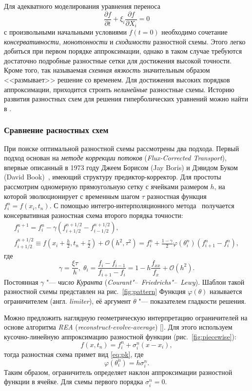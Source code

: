 Для адекватного моделирования уравнения переноса
\[ \frac{\partial f}{\partial t} + \xi_i\frac{\partial f}{\partial X_i} = 0 \]
с произвольными начальными условиями \( f(t=0)\)
необходимо сочетание \textit{консервативности}, \textit{монотонности} и \textit{сходимости} разностной схемы.
Этого легко добиться при первом порядке аппроксимации,
однако в таком случае требуются достаточно подробные разностные сетки для достижения высокой точности.
Кроме того, так называемая \textit{схемная вязкость} значительным образом <<размывает>> решение со временем.
Для достижения высоких порядков аппроксимации, приходится строить \textit{нелинейные} разностные схемы.
Историю развития разностных схем для решения гиперболических уравнений можно найти в \cite{vanLeer2006}.

\subsubsection{Сравнение расностных схем}

При поиске оптимальной разностной схемы рассмотрены два подхода.
Первый подход основан на \textit{методе коррекции потоков} (\textit{Flux-Corrected Transport}),
впервые описанный в 1973 году Джеем Борисом (Jay Boris) и Дэвидом Буком (David Book)~\cite{Boris1973},
имеющий структуру предиктор-корректор.
Для простоты рассмотрим одномерную прямоугольную сетку с ячейками размером \(h\),
на которой эволюционирует с временн\textit{ы}м шагом \(\tau\) разностная функция \(f_i^n = f(x_i,t_n)\).
С помощью интегро-интерпо\-ляционного метода~\cite{Samarsky1961} получается консервативная разностная схема второго порядка точности:
\begin{gather}\label{eq:pk}
	f_i^{n+1} = f_i^n - \gamma(f_{i+1/2}^{n+1/2}-f_{i-1/2}^{n+1/2}), \\
	f_{i+1/2}^{n+1/2} \equiv f\left(x_i+\frac{h}{2},t_n+\frac{\tau}{2}\right)+\mathcal{O}(h^2,\tau^2)
	= f_i^n + \frac{1-\gamma}{2}\varphi(\theta_i^n)(f_{i+1}^n - f_i^n),
\end{gather}
где \[ \gamma=\frac{\xi\tau}{h}, \; \theta_i = \frac{f_i - f_{i-1}}{f_{i+1} - f_i} = 1-h\frac{f_{xx}}{f_x}+\mathcal{O}(h^2).\]
Постоянная \(\gamma\) "--- \textit{число Куранта} (\textit{Courant"--~Friedrichs"--~Lewy}).
Шаблон такой разностной схемы представлен на рис.~\ref{fig:pattern}
Функция \(\varphi(\theta)\) называется ограничителем (англ. \textit{limiter}),
её аргумент \(\theta\) "--- показателем гладкости решения.

Можно предложить наглядную геометрическую интерпретацию ограничителей
на основе алгоритма \textit{REA} (\textit{reconstruct-evolve-average}) [].
Для этого используем кусочно-линейную аппроксимацию разностной функции (рис.~\ref{fig:piecewise}):
\[ f(x,t_n) = f_i^n + \sigma_i^n (x-x_i), \]
тогда разностная схема примет вид \eqref{eq:pk}, где
\[ \varphi(\theta_i^n) = h\sigma_i^n. \]
Таким образом, ограничитель определяет наклон аппроксимации разностной функции в ячейке.
Для схемы первого порядка \(\sigma_i^n=0\).

